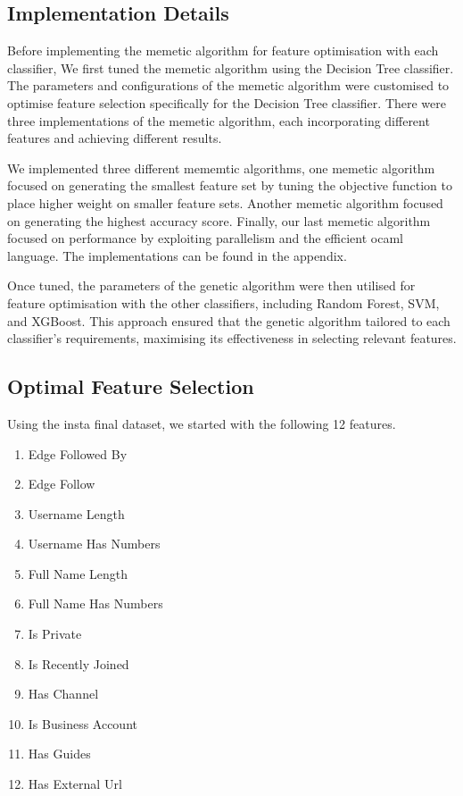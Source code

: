 \documentclass[conference]{IEEEtran}
\begin{document}
\subsection{Implementation Details}

Before implementing the memetic algorithm for feature optimisation with each classifier, We first tuned the memetic algorithm using the Decision Tree classifier. The parameters and configurations of the memetic algorithm were customised to optimise feature selection specifically for the Decision Tree classifier. There were three implementations of the memetic algorithm, each incorporating different features and achieving different results.

We implemented three different mememtic algorithms, one memetic algorithm focused on generating the smallest feature set by tuning the objective function to place higher weight on smaller feature sets. Another memetic algorithm focused on generating the highest accuracy score. Finally, our last memetic algorithm focused on performance by exploiting parallelism and the efficient ocaml language. The implementations can be found in the appendix.

Once tuned, the parameters of the genetic algorithm were then utilised for feature optimisation with the other classifiers, including Random Forest, SVM, and XGBoost. This approach ensured that the genetic algorithm tailored to each classifier's requirements, maximising its effectiveness in selecting relevant features.

\subsection{Optimal Feature Selection}

Using the insta final dataset, we started with the following 12 features.

\begin{enumerate}
	\item Edge Followed By
	\item Edge Follow
	\item Username Length
	\item Username Has Numbers
	\item Full Name Length
	\item Full Name Has Numbers
	\item Is Private
	\item Is Recently Joined
	\item Has Channel
	\item Is Business Account
	\item Has Guides
	\item Has External Url
\end{enumerate}
\end{document}
